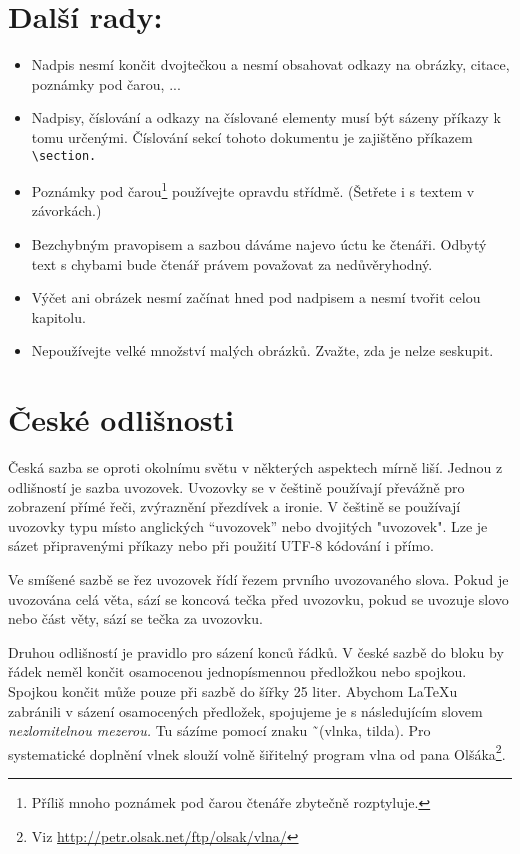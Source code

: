 \documentclass[a4paper, 10pt, twocolumn]{article}
\begin{document}
\section{Další rady:}
\begin{itemize}
  \item Nadpis nesmí končit dvojtečkou a nesmí obsahovat odkazy na obrázky, citace, poznámky pod čarou, ...
  \item Nadpisy, číslování a odkazy na číslované elementy musí být sázeny příkazy k tomu určenými.
   Číslování sekcí tohoto dokumentu je zajištěno příkazem {\verb!\section.!}
  \item Poznámky pod čarou\footnote[1]{Příliš mnoho poznámek pod čarou čtenáře zbytečně rozptyluje.} používejte opravdu střídmě. (Šetřete i s textem v závorkách.)
  \item Bezchybným pravopisem a sazbou dáváme najevo úctu ke čtenáři. Odbytý text s chybami bude čtenář právem považovat za nedůvěryhodný.
  \item Výčet ani obrázek nesmí začínat hned pod nadpisem a nesmí tvořit celou kapitolu.
  \item Nepoužívejte velké množství malých obrázků. Zvažte, zda je nelze seskupit.
\end{itemize}

\section{České odlišnosti}
Česká sazba se oproti okolnímu světu v některých aspektech mírně liší.
Jednou z odlišností je sazba uvozovek. Uvozovky se v češtině používají převážně pro zobrazení přímé řeči, zvýraznění přezdívek a ironie.
V češtině se používají uvozovky typu  místo anglických ``uvozovek'' nebo dvojitých "uvozovek".
Lze je sázet připravenými příkazy nebo při použití UTF-8 kódování i přímo.

Ve smíšené sazbě se řez uvozovek řídí řezem prvního uvozovaného slova.
Pokud je uvozována celá věta, sází se koncová tečka před uvozovku, pokud se uvozuje slovo nebo část věty, sází se tečka za uvozovku.

Druhou odlišností je pravidlo pro sázení konců řádků.
V české sazbě do bloku by řádek neměl končit osamocenou jednopísmennou předložkou nebo spojkou.
Spojkou  končit může pouze při sazbě do šířky 25 liter.
Abychom \LaTeX u zabránili v sázení osamocených předložek, spojujeme je s následujícím slovem \emph{nezlomitelnou mezerou.}
Tu sázíme pomocí znaku \~\ (vlnka, tilda). Pro systematické doplnění vlnek slouží volně šiřitelný program vlna od pana Olšáka\footnote[2]{Viz \url{http://petr.olsak.net/ftp/olsak/vlna/}}.
\end{document}
